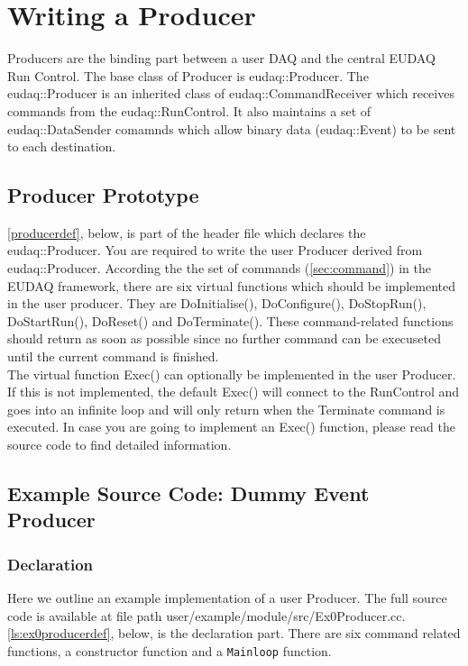 \section{Writing a Producer}\label{sec:ProducerWriting}
Producers are the binding part between a user DAQ and the central EUDAQ Run Control. The base class of Producer is eudaq::Producer. The eudaq::Producer is an inherited class of eudaq::CommandReceiver which receives commands from the eudaq::RunControl. It also maintains a set of eudaq::DataSender comamnds which allow binary data (eudaq::Event) to be sent to each destination.\\

\subsection{Producer Prototype}\label{sec:Producer_hh}

\autoref{producerdef}, below, is part of the header file which declares the eudaq::Producer. You are required to write the user Producer derived from eudaq::Producer. According the the set of commands (\autoref{sec:command}) in the EUDAQ framework, there are six virtual functions which should be implemented in the user producer. They are DoInitialise(), DoConfigure(), DoStopRun(), DoStartRun(), DoReset() and DoTerminate(). These command-related functions should return as soon as possible since no further command can be execuseted until the current command is finished. \\



The virtual function Exec() can optionally be implemented in the user Producer. If this is not implemented, the default Exec() will connect to the RunControl and goes into an infinite loop and will only return when the Terminate command is executed. In case you are going to implement an Exec() function, please read the source code to find detailed information.

\subsection{Example Source Code: Dummy Event Producer}\label{sec:Ex0Producer_cc}
\subsubsection{Declaration}
Here we outline an example implementation of a user Producer. The full source code is available at file path user/example/module/src/Ex0Producer.cc.  \autoref{ls:ex0producerdef}, below, is the declaration part. There are six command related functions, a constructor function and a \texttt{Mainloop} function. \\

